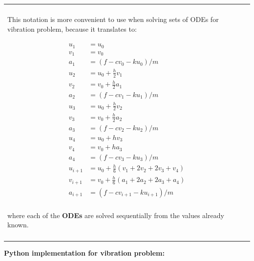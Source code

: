 \documentclass[10pt,b5paper,titlepage]{book}
\newenvironment{bbox}[1][1.0]
{
    \begin{center}
        \begin{tabular}{|p{#1\textwidth}|}
            \hline\\
}
{
            \\\\\hline
        \end{tabular}
    \end{center}
}
\newenvironment{ematrix}
{
    \begin{eqnarray}
        \begin{aligned}
}
{
        \end{aligned}
    \end{eqnarray}
}
\begin{document}
\begin{bbox}[0.96]
This notation is more convenient to use when solving sets of ODEs for vibration
problem, because it translates to:

\begin{ematrix}
    u_1 &= u_0\\
    v_1 &= v_0\\
    a_1 &= (f - c v_0 - k u_0) / m\\
    u_2 &= u_0 + \frac{h}{2} v_1\\
    v_2 &= v_0 + \frac{h}{2} a_1\\
    a_2 &= (f - c v_1 - k u_1) / m\\
    u_3 &= u_0 + \frac{h}{2} v_2\\
    v_3 &= v_0 + \frac{h}{2} a_2\\
    a_3 &= (f - c v_2 - k u_2) / m\\
    u_4 &= u_0 + h v_3\\
    v_4 &= v_0 + h a_3\\
    a_4 &= (f - c v_3 - k u_3) / m\\
    u_{i+1} &= u_0 + \frac{h}{6} \left( v_1 + 2 v_2 + 2 v_3 + v_4 \right) \\
    v_{i+1} &= v_0 + \frac{h}{6} \left( a_1 + 2 a_2 + 2 a_3 + a_4 \right) \\
    a_{i+1} &= (f - c v_{i+1} - k u_{i+1}) / m\\
\end{ematrix}

where each of the \textbf{ODEs} are solved sequentially from the values
already known.

\end{bbox}

\newpage
\textbf{Python implementation for vibration problem:}
\end{document}
